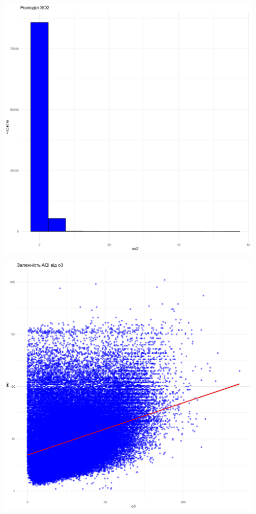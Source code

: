\documentclass[./report.tex]{subfiles}
\begin{document}
\begin{enumerate}
    \includegraphics[width=6in]{plots/question2/so2_plot.png}

    \includegraphics[width=6in]{plots/question2/scatter_plot.png}


\end{enumerate}
\end{document}
